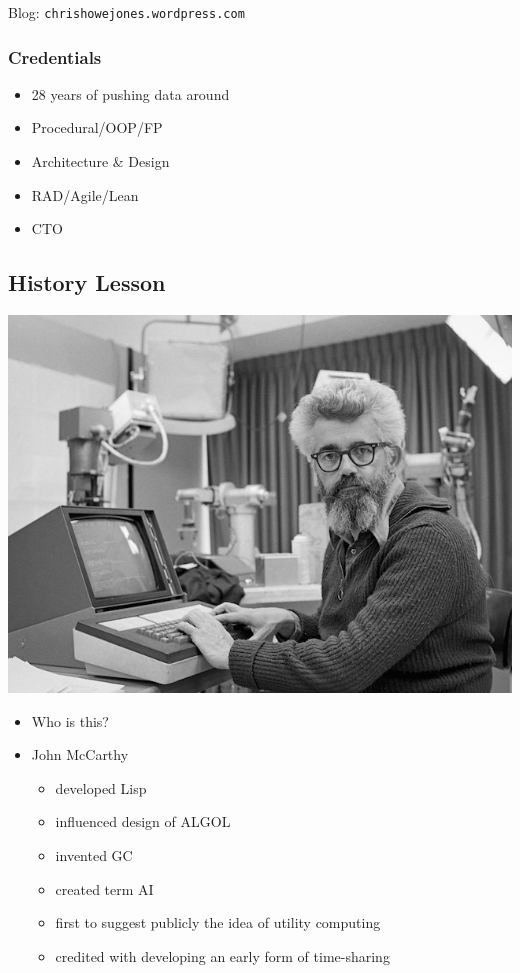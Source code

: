 \documentclass[11pt]{article}
\begin{document}
Blog:      \texttt{chrishowejones.wordpress.com}

\subsubsection*{Credentials}
\label{sec:orgheadline3}

\begin{itemize}
\item 28 years of pushing data around
\item Procedural/OOP/FP
\item Architecture \& Design
\item RAD/Agile/Lean
\item CTO
\end{itemize}

\subsection*{History Lesson}
\label{sec:orgheadline4}

\includegraphics[width=.9\linewidth]{./John-McCarthy.jpg}

\begin{NOTES}
\begin{itemize}
\item Who is this?
\item John McCarthy
\begin{itemize}
\item developed Lisp
\item influenced design of ALGOL
\item invented GC
\item created term AI
\item first to suggest publicly the idea of utility computing
\item credited with developing an early form of time-sharing
\end{itemize}
\end{itemize}
\end{NOTES}
\end{document}
